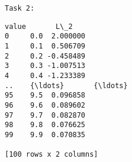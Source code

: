 \documentclass[11pt]{article}
\makeatletter
\newcommand{\boxspacing}{\kern\kvtcb@left@rule\kern\kvtcb@boxsep}
\newcommand{\prompt}[4]{
        {\ttfamily\llap{{\color{#2}[#3]:\hspace{3pt}#4}}\vspace{-\baselineskip}}
    }
\makeatother
\begin{document}
    \begin{Verbatim}[commandchars=\\\{\}]
Task 2:
    \end{Verbatim}

            \begin{tcolorbox}[breakable, size=fbox, boxrule=.5pt, pad at break*=1mm, opacityfill=0]
\prompt{Out}{outcolor}{145}{\boxspacing}
\begin{Verbatim}[commandchars=\\\{\}]
    value       L\_2
0     0.0  2.000000
1     0.1  0.506709
2     0.2 -0.458489
3     0.3 -1.007513
4     0.4 -1.233389
..    {\ldots}       {\ldots}
95    9.5  0.096858
96    9.6  0.089602
97    9.7  0.082870
98    9.8  0.076625
99    9.9  0.070835

[100 rows x 2 columns]
\end{Verbatim}
\end{tcolorbox}
        
\end{document}
